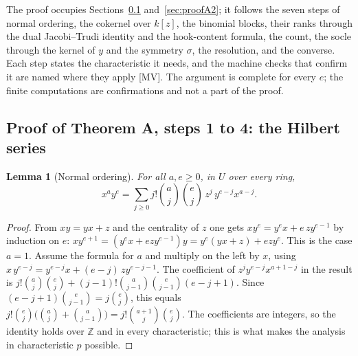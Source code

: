\documentclass[11pt]{article}
\newtheorem{lemma}{Lemma}
\theoremstyle{definition}
\theoremstyle{remark}
\newcommand{\Z}{\mathbb{Z}}
\begin{document}
The proof occupies Sections~\ref{sec:proofA1} and~\ref{sec:proofA2}; it follows the seven steps of normal ordering, the cokernel over $k[z]$, the binomial blocks, their ranks through the dual Jacobi--Trudi identity and the hook-content formula, the count, the socle through the kernel of $y$ and the symmetry $\sigma$, the resolution, and the converse. Each step states the characteristic it needs, and the machine checks that confirm it are named where they apply [MV]. The argument is complete for every $e$; the finite computations are confirmations and not a part of the proof.

\subsection{Proof of Theorem A, steps 1 to 4: the Hilbert series}
\label{sec:proofA1}

\begin{lemma}[Normal ordering]\label{lem:normal}
For all $a,e\ge0$, in $U$ over every ring,
\begin{equation}\label{eq:normal}
x^ay^e=\sum_{j\ge0}j!\binom aj\binom ej\,z^j\,y^{e-j}x^{a-j}.
\end{equation}
\end{lemma}
\begin{proof}
From $xy=yx+z$ and the centrality of $z$ one gets $xy^e=y^ex+e\,zy^{e-1}$ by induction on $e$: $xy^{e+1}=(y^ex+ezy^{e-1})y=y^e(yx+z)+ezy^e$. This is the case $a=1$. Assume the formula for $a$ and multiply on the left by $x$, using $x\,y^{e-j}=y^{e-j}x+(e-j)\,zy^{e-j-1}$. The coefficient of $z^jy^{e-j}x^{a+1-j}$ in the result is $j!\binom aj\binom ej+(j-1)!\binom a{j-1}\binom e{j-1}(e-j+1)$. Since $(e-j+1)\binom e{j-1}=j\binom ej$, this equals $j!\binom ej\big(\binom aj+\binom a{j-1}\big)=j!\binom{a+1}j\binom ej$. The coefficients are integers, so the identity holds over $\Z$ and in every characteristic; this is what makes the analysis in characteristic $p$ possible.
\end{proof}
\end{document}
